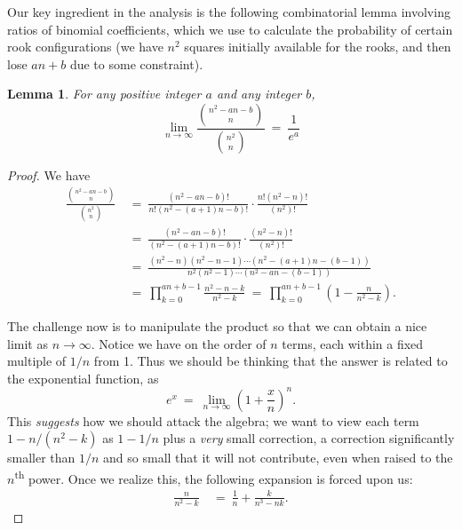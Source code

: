 \documentclass[12pt,reqno]{amsart}
\numberwithin{equation}{section}
\newtheorem{lem}[thm]{Lemma}
\theoremstyle{plain}
\newcommand\be{\begin{equation}}
\newcommand\ee{\end{equation}}
\newcommand{\ncr}[2]{{#1 \choose #2}}
\begin{document}
Our key ingredient in the analysis is the following combinatorial lemma involving ratios of binomial coefficients, which we use to calculate the probability of certain rook configurations (we have $n^2$ squares initially available for the rooks, and then lose $an+b$ due to some constraint).

\begin{lem}\label{lem:keybinomialratio} For any positive integer $a$ and any integer $b$,
$$\lim_{n\rightarrow \infty} \frac{\ncr{n^2 - an -b}{n}}{\ncr{n^2}{n}}\ =\ \frac{1}{e^a}$$
\end{lem}

\begin{proof} We have
\begin{align}
    \frac{\ncr{n^2 - an -b}{n}}{\ncr{n^2}{n}} &\ = \  \frac{(n^2 - an - b)!}{n!(n^2 - (a+1)n - b)!}  \cdot  \frac{n!(n^2-n)!}{(n^2)!} \nonumber\\
    &\ = \  \frac{(n^2 - an - b)!}{(n^2 - (a+1)n - b)!}  \cdot  \frac{(n^2-n)!}{(n^2)!} \nonumber\\
    &\ = \  \frac{(n^2 - n)(n^2 - n - 1) \cdots (n^2 - (a+1)n - (b-1))}{n^2 (n^2 - 1) \cdots  (n^2 - an - (b-1))} \nonumber\\
    &\ = \ \prod_{k=0}^{an+b-1}\frac{n^2 - n - k}{n^2 - k} \ = \  \prod_{k=0}^{an+b-1}\left(1-\frac{n}{n^2 - k}\right).
\end{align}

The challenge now is to manipulate the product so that we can obtain a nice limit as $n\to\infty$. Notice we have on the order of $n$ terms, each within a fixed multiple of $1/n$ from 1. Thus we should be thinking that the answer is related to the exponential function, as \be e^x \ = \ \lim_{n\to\infty} \left(1 + \frac{x}{n}\right)^n.\ee This \emph{suggests} how we should attack the algebra; we want to view each term $1 - n/(n^2-k)$ as $1 - 1/n$ plus a \emph{very} small correction, a correction significantly smaller than $1/n$ and so small that it will not contribute, even when raised to the $n$\textsuperscript{th} power. Once we realize this, the following expansion is forced upon us:
\begin{align}
    \frac{n}{n^2 - k} &\ = \  \frac{1}{n} + \frac{k}{n^3 -n k}.
\end{align}


\end{proof}
\end{document}
